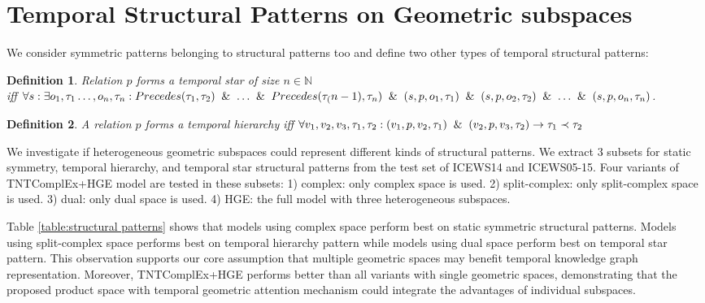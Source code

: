 \documentclass[letterpaper]{article} %
\newtheorem{definition}{Definition}
\begin{document}
\section{Temporal Structural Patterns on Geometric subspaces}
We consider symmetric patterns belonging to structural patterns too and define two other types of temporal structural patterns:
\begin{definition}
Relation $p$ forms a temporal star of size $n\in\mathbb{N}$\\
iff $\forall s: \exists o_1,\tau_1 \ldots, 
 o_n, \tau_n: Precedes(\tau_1, \tau_2) \And \ldots \And Precedes(\tau_(n-1), \tau_n) \And (s,p, o_1, \tau_1) \And (s,p, o_2, \tau_2) \And \ldots \And (s,p, o_n, \tau_n)$. 
\end{definition}

\label{sec:structural_pattern_analysis}
\begin{definition}\label{temphierarchy}
A relation $p$ forms a temporal hierarchy iff $\forall v_1, v_2, v_3, \tau_1, \tau_2: (v_1,p,v_2,\tau_1)\And (v_2,p,v_3,\tau_2) \rightarrow \tau_1 \prec \tau_2 
$ 
\end{definition}


We investigate if heterogeneous geometric subspaces could represent different kinds of structural patterns. We extract 3 subsets for static symmetry, temporal hierarchy, and temporal star structural patterns from the test set of ICEWS14 and ICEWS05-15. Four variants of TNTComplEx+HGE model are tested in these subsets: 1) complex: only complex space is used. 2) split-complex: only split-complex space is used. 3) dual: only dual space is used. 4) HGE: the full model with three heterogeneous subspaces. 


 Table \ref{table:structural patterns} shows that models using complex space perform best on static symmetric structural patterns. Models using split-complex space performs best on temporal hierarchy pattern while models using dual space perform best on temporal star pattern. This observation supports our core assumption 
that multiple geometric spaces may benefit temporal knowledge graph representation. Moreover, TNTComplEx+HGE performs better than all variants with single geometric spaces, demonstrating that the proposed product space with temporal geometric attention mechanism could integrate the advantages of individual subspaces. 
\end{document}
